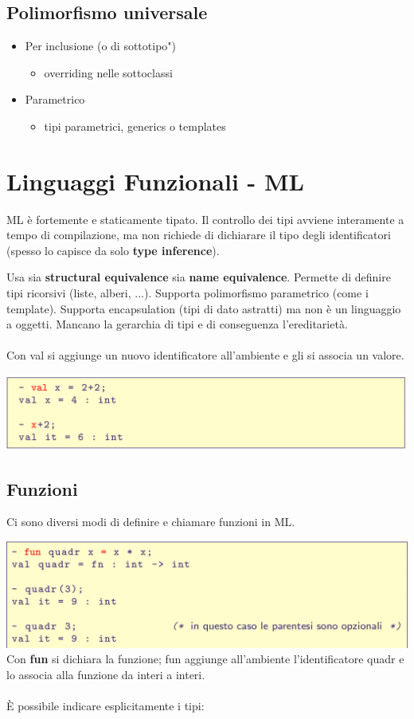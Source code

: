 \documentclass[10pt]{article}
\begin{document}
\subsection{Polimorfismo universale}
\begin{itemize}
    \item Per inclusione (o di sottotipo")
    \begin{itemize}
        \item overriding nelle sottoclassi
    \end{itemize}
    \item Parametrico
    \begin{itemize}
        \item tipi parametrici, generics o templates
    \end{itemize}
\end{itemize}
\section{Linguaggi Funzionali - ML}
ML è fortemente e staticamente tipato.
Il controllo dei tipi avviene interamente a tempo di
compilazione, ma non richiede di dichiarare il tipo degli identificatori (spesso lo capisce da solo \textbf{type inference}).

Usa sia \textbf{structural equivalence} sia \textbf{name equivalence}.
Permette di definire tipi ricorsivi (liste, alberi, ...).
Supporta polimorfismo parametrico (come i template).
Supporta encapsulation (tipi di dato astratti) ma non è un
linguaggio a oggetti.
Mancano la gerarchia di tipi e di conseguenza l’ereditarietà.
\\\\
Con val si aggiunge un nuovo identificatore all’ambiente e gli si
associa un valore.

\includegraphics[scale=0.2]{Immagini/ml4.png}
\subsection{Funzioni}
Ci sono diversi modi di definire e chiamare funzioni in ML.

\includegraphics[scale=0.2]{Immagini/ml1.png}
\\
Con \textbf{fun} si dichiara la funzione;
fun aggiunge all’ambiente l’identificatore quadr
e lo associa alla funzione da interi a interi.
\\\\
È possibile indicare esplicitamente i tipi:
\end{document}
